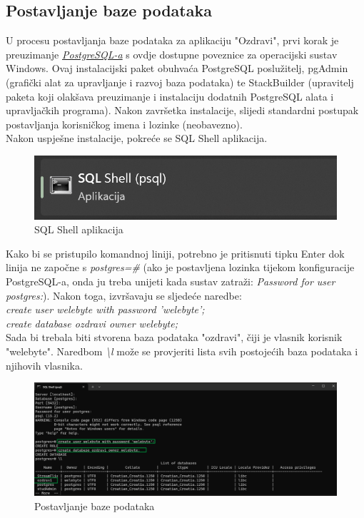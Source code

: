 			
	\subsection*{Postavljanje baze podataka}
	U procesu postavljanja baze podataka za aplikaciju "Ozdravi", prvi korak je preuzimanje 
	\href{https://www.postgresql.org/download/}{\textit{PostgreSQL-a}} s ovdje dostupne poveznice za operacijski 
	sustav Windows. Ovaj instalacijski paket obuhvaća PostgreSQL poslužitelj, pgAdmin 
	(grafički alat za upravljanje i razvoj baza podataka) te StackBuilder (upravitelj paketa koji 
	olakšava preuzimanje i instalaciju dodatnih PostgreSQL alata i upravljačkih programa). Nakon završetka 
	instalacije, slijedi standardni postupak postavljanja korisničkog imena i lozinke (neobavezno). \\
	Nakon uspješne instalacije, pokreće se SQL Shell aplikacija.	\\
	
	\begin{figure}[H]
		\includegraphics[width=\textwidth]{slike/sqlshell1.png} 
		\caption{SQL Shell aplikacija} 
	\end{figure}
	 Kako bi se pristupilo komandnoj liniji, potrebno je pritisnuti tipku Enter dok linija ne započne s \textit{postgres=\#}
	(ako je postavljena lozinka tijekom konfiguracije PostgreSQL-a, onda ju treba unijeti kada sustav zatraži: \textit{Password for user postgres:}). 
	Nakon toga, izvršavaju se sljedeće naredbe:\\
	\textit{create user welebyte with password 'welebyte';\\
	create database ozdravi owner welebyte;}\\
	Sada bi trebala biti stvorena baza podataka "ozdravi", čiji je vlasnik korisnik "welebyte". Naredbom \textit{\textbackslash l} može se provjeriti lista svih postojećih 
	baza podataka i njihovih vlasnika. \\
	\begin{figure}[H]
		\includegraphics[width=\textwidth]{slike/sqlshell2.png} 
		\caption{Postavljanje baze podataka} 
	\end{figure}
